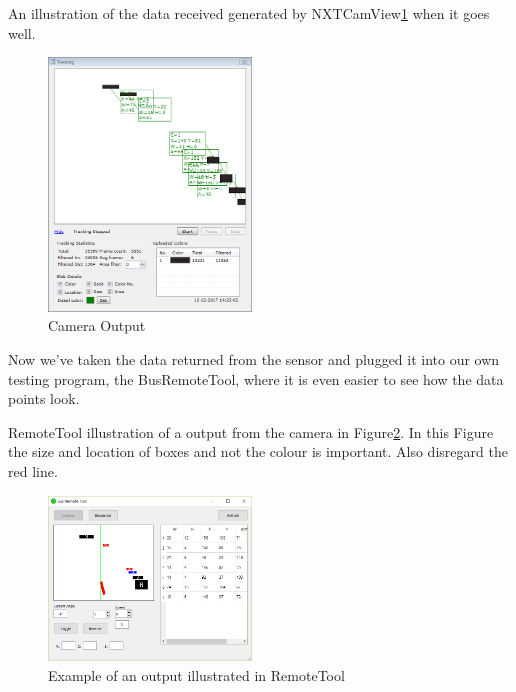 An illustration of the data received generated by NXTCamView\ref{fig:CamOutput1} when it goes well.
\begin{figure}[H]
    \centering
    \includegraphics[width=0.48\textwidth]{Images/Analysis/NXTCamTesting/NXTCamView_Boxes_1.png}
    \caption{Camera Output}
    \label{fig:CamOutput1}
\end{figure}

Now we've taken the data returned from the sensor and plugged it into our own testing program, the BusRemoteTool, where it is even easier to see how the data points look.

RemoteTool illustration of a output from the camera in Figure\ref{fig:RemoteToolOutput1}. In this Figure the size and location of boxes and not the colour is important. Also disregard the red line.
\begin{figure}[H]
    \centering
    \includegraphics[width=0.48\textwidth]{Images/Analysis/NXTCamTesting/BusRemoteTool_Good.png}
    \caption{Example of an output illustrated in RemoteTool}
    \label{fig:RemoteToolOutput1}
\end{figure}




